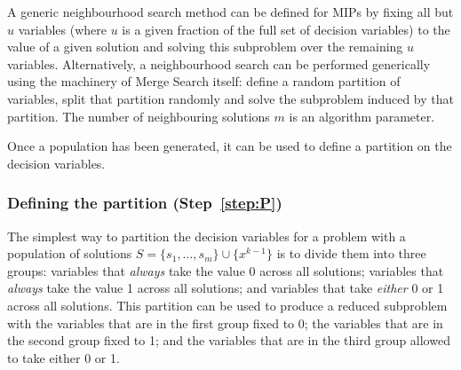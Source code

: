 \documentclass[authoryear,11pt,square,number,times,super,comma]{elsarticle}
\begin{document}
A generic neighbourhood search method can be defined for MIPs by fixing all but \(u\) variables (where \(u\) is a given fraction of the full set of decision variables) to the value of a given solution and solving this subproblem over the remaining \(u\) variables. Alternatively, a neighbourhood search can be performed generically using the machinery of Merge Search itself: define a random partition of variables, split that partition randomly and solve the subproblem induced by that partition. The number of neighbouring solutions $m$ is an algorithm parameter.

Once a population has been generated, it can be used to define a partition on the decision variables.

\subsubsection*{Defining the partition (Step~\ref{step:P})}


The simplest way to partition the decision variables for a problem with a population of solutions $S = \{s_1,\dots,s_m\}\cup \{x^{k-1}\}$ is to divide them into three groups: variables that \emph{always} take the value 0 across all solutions; variables that \emph{always} take the value 1 across all solutions; and variables that take \emph{either} 0 or 1 across all solutions. This partition can be used to produce a reduced subproblem with the variables that are in the first group fixed to 0; the variables that are in the second group fixed to 1; and the variables that are in the third group allowed to take either 0 or 1.
\end{document}
